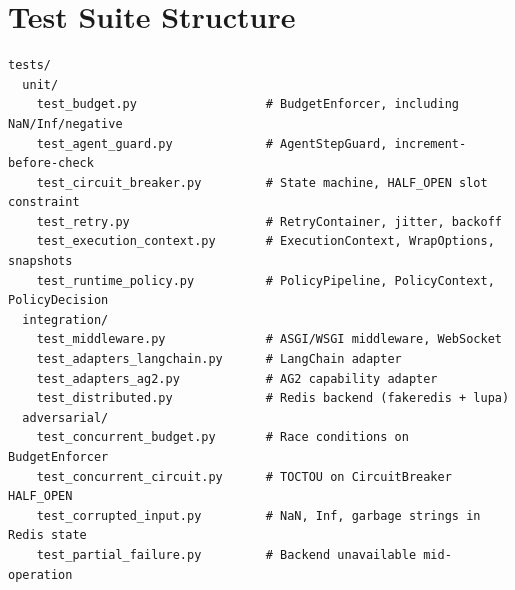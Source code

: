\documentclass[11pt]{article}
\begin{document}
\section{Test Suite Structure}
\label{sec:appendix-tests}

\begin{lstlisting}[style=plain]
tests/
  unit/
    test_budget.py                  # BudgetEnforcer, including NaN/Inf/negative
    test_agent_guard.py             # AgentStepGuard, increment-before-check
    test_circuit_breaker.py         # State machine, HALF_OPEN slot constraint
    test_retry.py                   # RetryContainer, jitter, backoff
    test_execution_context.py       # ExecutionContext, WrapOptions, snapshots
    test_runtime_policy.py          # PolicyPipeline, PolicyContext, PolicyDecision
  integration/
    test_middleware.py              # ASGI/WSGI middleware, WebSocket
    test_adapters_langchain.py      # LangChain adapter
    test_adapters_ag2.py            # AG2 capability adapter
    test_distributed.py             # Redis backend (fakeredis + lupa)
  adversarial/
    test_concurrent_budget.py       # Race conditions on BudgetEnforcer
    test_concurrent_circuit.py      # TOCTOU on CircuitBreaker HALF_OPEN
    test_corrupted_input.py         # NaN, Inf, garbage strings in Redis state
    test_partial_failure.py         # Backend unavailable mid-operation
\end{lstlisting}
\end{document}
